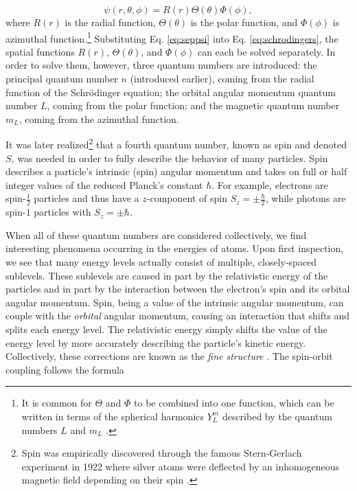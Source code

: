 \begin{equation}
	\psi(r, \theta, \phi) = R(r) \Theta(\theta) \Phi(\phi), 
	\label{eq:seppsi}
\end{equation}
%
where $R(r)$ is the radial function, $\Theta(\theta)$ is the polar function, and $\Phi(\phi)$ is azimuthal function.\footnote{It is common for $\Theta$ and $\Phi$ to be combined into one function, which can be written in terms of the spherical harmonics $Y^m _L$ described by the quantum numbers $L$ and $m_L$ \cite{Townsend}.} Substituting Eq. \ref{eq:seppsi} into Eq. \ref{eq:schrodingers}, the spatial functions $R(r)$, $\Theta(\theta)$, and $\Phi(\phi)$ can each be solved separately. In order to solve them, however, three quantum numbers are introduced: the principal quantum number $n$ (introduced earlier), coming from the radial function of the Schr\"{o}dinger equation; the orbital angular momentum quantum number $L$, coming from the polar function; and the magnetic quantum number $m_L$, coming from the azimuthal function.


It was later realized\footnote{Spin was empirically discovered through the famous Stern-Gerlach experiment in 1922 where silver atoms were deflected by an inhomogeneous magnetic field depending on their spin \cite{Townsend}.} that a fourth quantum number, known as spin and denoted $S$, was needed in order to fully describe the behavior of many particles. Spin describes a particle's intrinsic (spin) angular momentum and takes on full or half integer values of the reduced Planck's constant $\hbar$. For example, electrons are spin-$\frac{1}{2}$ particles and thus have a $z$-component of spin $S_z = \pm \frac{\hbar}{2}$, while photons are spin-$1$ particles with $S_z = \pm \hbar$. 

When all of these quantum numbers are considered collectively, we find interesting phenomena occurring in the energies of atoms. Upon first inspection, we see that many energy levels actually consist of multiple, closely-spaced sublevels. These sublevels are caused in part by the relativistic energy of the particles and in part by the interaction between the electron's spin and its orbital angular momentum. Spin, being a value of the intrinsic angular momentum, can couple with the \textit{orbital} angular momentum, causing an interaction that shifts and splits each energy level. The relativistic energy simply shifts the value of the energy level by more accurately describing the particle's kinetic energy. Collectively, these corrections are known as the \textit{fine structure} \cite{Kibblewhite2009}. The spin-orbit coupling follows the formula 

